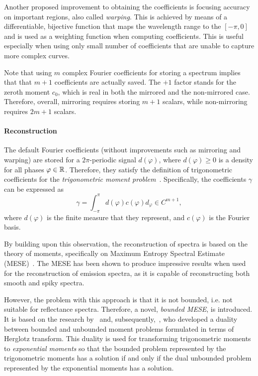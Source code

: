 Another proposed improvement to obtaining the coefficients is focusing accuracy on important regions, also called \emph{warping}. This is achieved by means of a differentiable, bijective function that maps the wavelength range to the $[-\pi, 0]$ and is used as a weighting function when computing coefficients. This is useful especially when using only small number of coefficients that are unable to capture more complex curves.

Note that using $m$ complex Fourier coefficients for storing a spectrum implies that that $m+1$ coefficients are actually saved. The $+1$ factor stands for the zeroth moment $c_0$, which is real in both the mirrored and the non-mirrored case. Therefore, overall, mirroring requires storing $m+1$ scalars, while non-mirroring requires $2m+1$ scalars.

\paragraph{Reconstruction} 

The default Fourier coefficients (without improvements such as mirroring and warping) are stored for a $2\pi$-periodic signal $d(\varphi)$, where $d(\varphi) \ge 0$ is a density for all phases $\varphi \in \mathbb{R}$. Therefore, they satisfy the definition of trigonometric coefficients for the \emph{trigonometric moment problem}~\cite{trigonometricMomentProblemDefiniton}. Specifically, the coefficients $\gamma$ can be expressed as
\begin{equation} \label{trigonometricCoeffsComputation}
\gamma = \int_{-\pi}^{\pi} d(\varphi) c(\varphi)d_\varphi \in C^{m+1},
\end{equation}
where $d(\varphi)$ is the finite measure that they represent, and $c(\varphi)$ is the Fourier basis.

By building upon this observation, the reconstruction of spectra is based on the theory of moments, specifically on Maximum Entropy Spectral Estimate (MESE)~\cite{unboundedMESEoriginal}. The MESE has been shown to produce impressive results when used for the reconstruction of emission spectra, as it is capable of reconstructing both smooth and spiky spectra.

However, the problem with this approach is that it is not bounded, i.e. not suitable for reflectance spectra. Therefore, a novel, \emph{bounded MESE}, is introduced. It is based on the research by~\citet{dualityBoundedUnboundedMarkoff} and, subsequently,~\citet{dualityBoundedUnboundedKrein}, who developed a duality between bounded and unbounded moment problems formulated in terms of Herglotz transform. This duality is used for transforming trigonometric moments to \emph{exponential moments} so that the bounded problem represented by the trigonometric moments has a solution if and only if the dual unbounded problem represented by the exponential moments has a solution.


